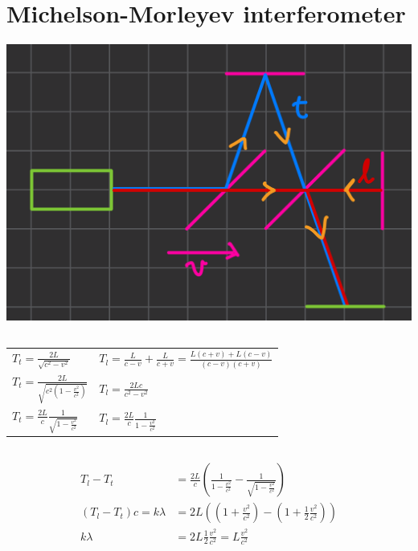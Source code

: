 \documentclass[a4paper,12pt]{article}
\begin{document}
\section{Michelson-Morleyev interferometer}
\includegraphics[width=\textwidth]{michelson.png}
\subsection{}
\begin{table}[h!]
    \centering
    \begin{tabularx}{\textwidth}{YY}
        $T_t = \frac{2L}{\sqrt{c^2 - v^2}}$                       & $T_l = \frac{L}{c-v} + \frac{L}{c+v} = \frac{L(c+v) + L(c-v)}{(c-v)(c+v)}$ \\
        $T_t = \frac{2L}{\sqrt{c^2 (1 - \frac{v^2}{c^2})}}$       & $T_l = \frac{2L c}{c^2 - v^2}$                                             \\
        $T_t = \frac{2L}{c} \frac{1}{\sqrt{1 - \frac{v^2}{c^2}}}$ & $T_l = \frac{2L}{c} \frac{1}{1- \frac{v^2}{c^2}}$                          \\
    \end{tabularx}
\end{table}

\subsection{}
\begin{align}
    T_l - T_t                 & = \frac{2L}{c} \left( \frac{1}{1 - \frac{v^2}{c^2}} - \frac{1}{\sqrt{1 - \frac{v^2}{c^2}}} \right) \\
    (T_l - T_t) c = k \lambda & = 2L \left( (1 + \frac{v^2}{c^2}) - (1 + \frac 1 2 \frac{v^2}{c^2}) \right)                        \\
    k \lambda                 & = 2L \frac{1}{2} \frac{v^2}{c^2} = L \frac{v^2}{c^2}
\end{align}
\end{document}
